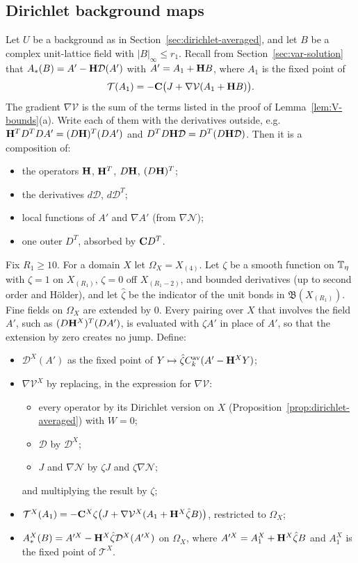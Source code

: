 \subsection{Dirichlet background maps}\label{ss:39.2}

Let $U$ be a background as in Section~\ref{sec:dirichlet-averaged}, and let $B$ be a complex unit-lattice field with $|B|_\infty\le r_1$. Recall from Section~\ref{sec:var-solution} that $A_*(B)=A'-\mathbf H\mathcal D(A')$ with $A'=A_1+\mathbf H B$, where $A_1$ is the fixed point of
\[
\mathcal T(A_1)=-\mathbf C\big(J+\nabla\mathcal V(A_1+\mathbf H B)\big).
\]
The gradient $\nabla\mathcal V$ is the sum of the terms listed in the proof of Lemma~\ref{lem:V-bounds}(a). Write each of them with the derivatives outside, e.g.\ $\mathbf H^TD^TDA'=(D\mathbf H)^T(DA')$ and $D^TD\mathbf H\mathcal D=D^T(D\mathbf H\mathcal D)$. Then it is a composition of:
\begin{itemize}
\item the operators $\mathbf H$, $\mathbf H^T$, $D\mathbf H$, $(D\mathbf H)^T$;
\item the derivatives $d\mathcal D$, $d\mathcal D^T$;
\item local functions of $A'$ and $\nabla A'$ (from $\nabla\mathcal N$);
\item one outer $D^T$, absorbed by $\mathbf C D^T$.
\end{itemize}

\begin{definition}\label{def:dirichlet-map}
Fix $R_1\ge10$. For a domain $X$ let $\Omega_X=X_{(4)}$. Let $\zeta$ be a smooth function on $\mathbb T_\eta$ with $\zeta=1$ on $X_{(R_1)}$, $\zeta=0$ off $X_{(R_1-2)}$, and bounded derivatives (up to second order and H\"older), and let $\hat\zeta$ be the indicator of the unit bonds in $\mathfrak B(X_{(R_1)})$. Fine fields on $\Omega_X$ are extended by $0$. Every pairing over $X$ that involves the field $A'$, such as $(D\mathbf H^X)^T(DA')$, is evaluated with $\zeta A'$ in place of $A'$, so that the extension by zero creates no jump. Define:
\begin{itemize}
\item $\mathcal D^X(A')$ as the fixed point of $Y\mapsto\hat\zeta C^{\rm av}_k(A'-\mathbf H^XY)$;
\item $\nabla\mathcal V^X$ by replacing, in the expression for $\nabla\mathcal V$:
  \begin{itemize}
  \item every operator by its Dirichlet version on $X$ (Proposition~\ref{prop:dirichlet-averaged}) with $W=0$;
  \item $\mathcal D$ by $\mathcal D^X$;
  \item $J$ and $\nabla\mathcal N$ by $\zeta J$ and $\zeta\nabla\mathcal N$;
  \end{itemize}
  and multiplying the result by $\zeta$;
\item $\mathcal T^X(A_1)=-\mathbf C^X\zeta\big(J+\nabla\mathcal V^X(A_1+\mathbf H^X\hat\zeta B)\big)$, restricted to $\Omega_X$;
\item $A^X_*(B)=A'^X-\mathbf H^X\hat\zeta\mathcal D^X(A'^X)$ on $\Omega_X$, where $A'^X=A^X_1+\mathbf H^X\hat\zeta B$ and $A^X_1$ is the fixed point of $\mathcal T^X$.
\end{itemize}
\end{definition}

